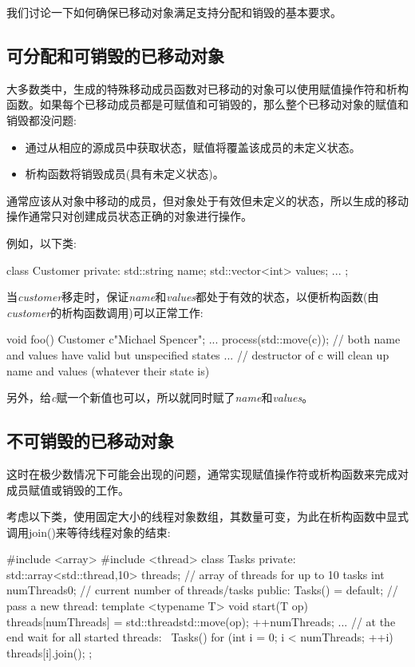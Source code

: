 我们讨论一下如何确保已移动对象满足支持分配和销毁的基本要求。

\subsection{可分配和可销毁的已移动对象}

大多数类中，生成的特殊移动成员函数对已移动的对象可以使用赋值操作符和析构函数。如果每个已移动成员都是可赋值和可销毁的，那么整个已移动对象的赋值和销毁都没问题:

\begin{itemize}
	\item 通过从相应的源成员中获取状态，赋值将覆盖该成员的未定义状态。
	\item 析构函数将销毁成员(具有未定义状态)。
\end{itemize}

通常应该从对象中移动的成员，但对象处于有效但未定义的状态，所以生成的移动操作通常只对创建成员状态正确的对象进行操作。

例如，以下类:

\begin{cppcode}
class Customer {
private:
	std::string name;
	std::vector<int> values;
	...
};
\end{cppcode}

当\textit{customer}移走时，保证\textit{name}和\textit{values}都处于有效的状态，以便析构函数(由\textit{customer}的析构函数调用)可以正常工作:

\begin{cppcode}
void foo()
{
	Customer c{"Michael Spencer"};
	...
	process(std::move(c));
	// both name and values have valid but unspecified states
	...
} // destructor of c will clean up name and values (whatever their state is)
\end{cppcode}

另外，给\textit{c}赋一个新值也可以，所以就同时赋了\textit{name}和\textit{values}。

\subsection{不可销毁的已移动对象}

这时在极少数情况下可能会出现的问题，通常实现赋值操作符或析构函数来完成对成员赋值或销毁的工作。

考虑以下类，使用固定大小的线程对象数组，其数量可变，为此在析构函数中显式调用join()来等待线程对象的结束:

\begin{cppcode}
#include <array>
#include <thread>
class Tasks {
	private:
	std::array<std::thread,10> threads; // array of threads for up to 10 tasks
	int numThreads{0}; // current number of threads/tasks
	public:
	Tasks() = default;
	// pass a new thread:
	template <typename T>
	void start(T op) {
		threads[numThreads] = std::thread{std::move(op)};
		++numThreads;
	}
	...
	// at the end wait for all started threads:
	~Tasks() {
		for (int i = 0; i < numThreads; ++i) {
			threads[i].join();
		}
	}
};
\end{cppcode}

